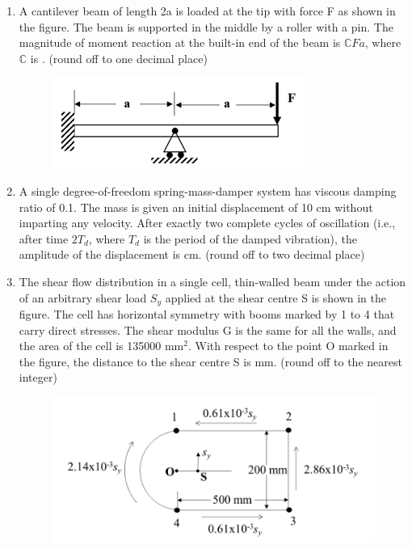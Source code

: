 \documentclass{article}
\begin{document}
\begin{enumerate}[leftmargin=*, resume]
\item A cantilever beam of length 2a is loaded at the tip with force F as shown in the figure. The beam is supported in the middle by a roller with a pin. The magnitude of moment reaction at the built-in end of the beam is $\mathbb{C} Fa$, where $\mathbb{C}$ is \underline{\hspace{1.5cm}}. (round off to one decimal place)
\begin{figure}[H]
    \centering
    \includegraphics[width=0.5\linewidth]{figs/q50.png}
    \caption{}
    \label{fig:q50}
\end{figure}

\item A single degree-of-freedom spring-mass-damper system has viscous damping ratio of 0.1. The mass is given an initial displacement of 10 cm without imparting any velocity. After exactly two complete cycles of oscillation (i.e., after time $2T_d$, where $T_d$ is the period of the damped vibration), the amplitude of the displacement is \underline{\hspace{1.5cm}} cm. (round off to two decimal place)

\item The shear flow distribution in a single cell, thin-walled beam under the action of an arbitrary shear load $S_y$ applied at the shear centre S is shown in the figure. The cell has horizontal symmetry with booms marked by 1 to 4 that carry direct stresses. The shear modulus G is the same for all the walls, and the area of the cell is 135000 mm$^2$. With respect to the point O marked in the figure, the distance to the shear centre S is \underline{\hspace{1.5cm}} mm. (round off to the nearest integer)
\begin{figure}[H]
    \centering
    \includegraphics[width=0.5\linewidth]{figs/q52.png}
    \caption{}
    \label{fig:q52}
\end{figure}


\end{enumerate}
\end{document}
